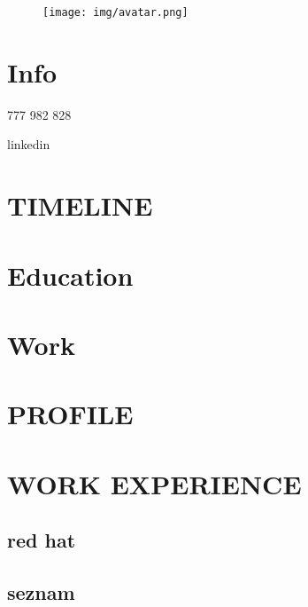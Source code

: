 \documentclass{mycv}
\begin{document}
\begin{paracol}{3}


\begin{figure}[h!]
  \texttt{[image: img/avatar.png]}
\end{figure}

\section{Info}


\address{Brno}

777 982 828

linkedin


\section{TIMELINE}

\lipsum[1]

\switchcolumn
\switchcolumn

\section{Education}

\section{Work}

\section{PROFILE}

\lipsum[2]

\section{WORK EXPERIENCE}
\subsection{red hat}
\subsection{seznam}

\end{paracol}
\end{document}
